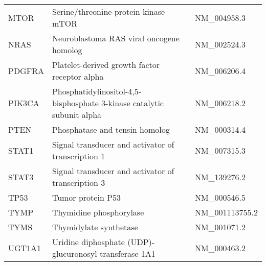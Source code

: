 \begin{table}
\begin{tabular}{ l l l }
    MTOR & Serine/threonine-protein kinase mTOR & NM\_004958.3 \\
    NRAS & Neuroblastoma RAS viral oncogene homolog & NM\_002524.3 \\
    PDGFRA & Platelet-derived growth factor receptor alpha & NM\_006206.4 \\
    PIK3CA & Phosphatidylinositol-4,5-bisphosphate 3-kinase catalytic subunit alpha & NM\_006218.2 \\
    PTEN & Phosphatase and tensin homolog & NM\_000314.4 \\
    STAT1 & Signal transducer and activator of transcription 1 & NM\_007315.3 \\
    STAT3 & Signal transducer and activator of transcription 3 & NM\_139276.2 \\
    TP53 & Tumor protein P53 & NM\_000546.5 \\
    TYMP & Thymidine phosphorylase & NM\_001113755.2 \\
    TYMS & Thymidylate synthetase & NM\_001071.2 \\
    UGT1A1 & Uridine diphosphate (UDP)-glucuronosyl transferase 1A1 & NM\_000463.2\\
    \bottomrule
    \end{tabular}
\end{table}
